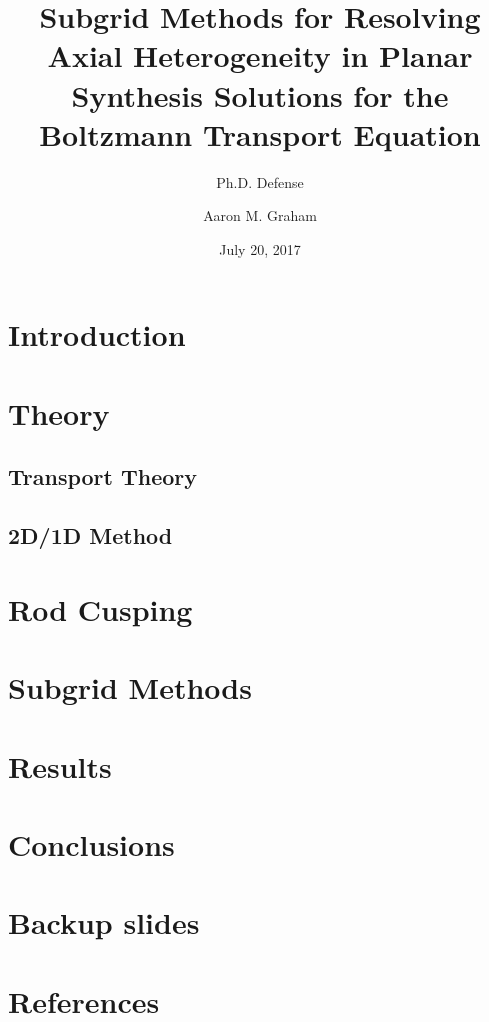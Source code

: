 \documentclass{beamer}
\title[Planar Synthesis Subgrid Methods]{Subgrid Methods for Resolving Axial Heterogeneity in Planar Synthesis Solutions for the Boltzmann Transport Equation}
\subtitle{Ph.D. Defense}
\author{Aaron M. Graham}
\date{July 20, 2017}
\begin{document}
\begin{frame}[t]
    \titlepage
\end{frame}

\begin{frame}[t]
    \tableofcontents[hideallsubsections]
\end{frame}

\section{Introduction}


\section{Theory}
\subsection{Transport Theory}


\subsection{2D/1D Method}


\section{Rod Cusping}


\section{Subgrid Methods}


\section{Results}


\section{Conclusions}


\appendix

\section*{Backup slides}


\section*{References}
\renewcommand{\bibname}{References}


\end{document}
